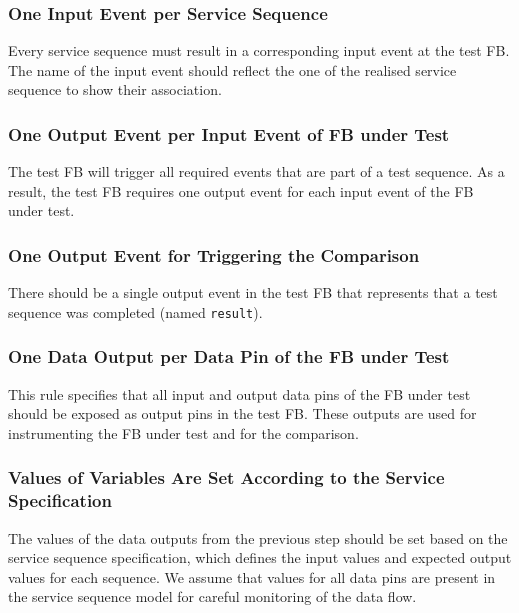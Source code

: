 \documentclass[conference]{IEEEtran}
\begin{document}
\subsubsection{One Input Event per Service Sequence}
Every service sequence must result in a corresponding input event at the test FB. The name of the input event should reflect the one of the realised service sequence to show their association. %

\subsubsection{One Output Event per Input Event of FB under Test}
The test FB will trigger all required events that are part of a test sequence. As a result, the test FB requires one output event for each input event of the FB under test. 

\subsubsection{One Output Event for Triggering the Comparison}
There should be a single output event in the test FB that represents that a test sequence was completed (named \texttt{result}).

\subsubsection{One Data Output per Data Pin of the FB under Test}
This rule specifies that all input and output data pins of the FB under test should be exposed as output pins in the test FB. These outputs are used for instrumenting the FB under test and for the comparison.

\subsubsection{Values of Variables Are Set According to the Service Specification}
The values of the data outputs from the previous step should be set based on the service sequence specification, which defines the input values and expected output values for each sequence. We assume that values for all data pins are present in the service sequence model for careful monitoring of the data flow. %
\end{document}
